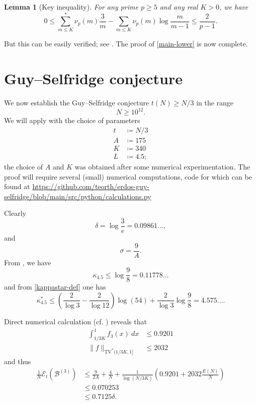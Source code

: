 \documentclass[12pt,a4paper,reqno]{amsart}
\numberwithin{equation}{section}
\theoremstyle{plain}
\newtheorem{lemma}[theorem]{Lemma}
\theoremstyle{definition}
\newcommand\tuple{{\mathcal B}}
\newcommand\excess{{\mathcal{E}}}
\begin{document}
\begin{lemma}[Key inequality]\label{key-ineq} For any prime $p\geq 5$ and any real $K > 0$, we have
$$ 0 \leq \sum_{m \leq K}^* \nu_p(m) \frac{3}{m} - \sum_{m \leq K} \nu_p(m) \log \frac{m}{m-1} \leq \frac{2}{p-1}.$$
\end{lemma}

But this can be easily verified; see .  The proof of \eqref{main-lower} is now complete.

\section{Guy--Selfridge conjecture}

We now establish the Guy--Selfridge conjecture $t(N) \geq N/3$ in the range
$$ N \geq 10^{12}.$$
We will apply  with the choice of parameters
\begin{align*}
  t &\coloneqq N/3\\
  A &\coloneqq 175\\
  K &\coloneqq 340 \\
  L &\coloneqq 4.5;
\end{align*}
the choice of $A$ and $K$ was obtained after some numerical experimentation.  The proof will require several (small) numerical computations, code for which can be found at \url{https://github.com/teorth/erdos-guy-selfridge/blob/main/src/python/calculations.py}


Clearly 
\begin{equation}\label{delta-exact}
  \delta = \log \frac{3}{e} = 0.09861\dots, 
\end{equation}
and
$$ \sigma = \frac{9}{A}.$$
From , we have
\begin{equation}\label{kappa-k}
  \kappa_{4.5} \leq \log \frac{9}{8} = 0.11778\dots
\end{equation}
and from \eqref{kappastar-def} one has
\begin{equation}\label{kappa-star-def}
 \kappa^*_{4.5} \leq \left(\frac{2}{\log 3} - \frac{2}{\log 12}\right) \log(54) + \frac{2}{\log 3} \log \frac{9}{8} = 4.575\dots.
\end{equation}

Direct numerical calculation (cf. ) reveals that
\begin{align*}
  \int_{1/3K}^1 f_3(x)\ dx &\leq 0.9201  \\
  \|f\|_{\mathrm{TV}^*(1/3K,1]} &\leq 2032
\end{align*}
and thus
\begin{align*}
  \frac{1}{N}\excess_t(\tuple^{(3)}) &\leq \frac{9}{2A} + \frac{4}{N} + \frac{1}{\log(N/3K)} \left(0.9201 + 2032 \frac{E(N)}{N}\right) \\
  &\leq 0.070253 \\
  &\leq 0.7125 \delta.
\end{align*}
\end{document}
